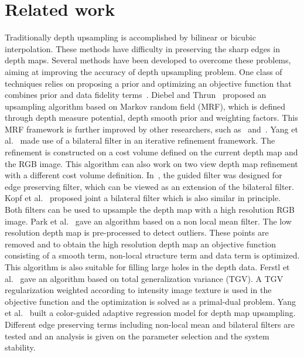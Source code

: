 \section{Related work}
\label{sec:2.relate_work}
Traditionally depth upsampling is accomplished by bilinear or bicubic interpolation. These methods have difficulty in preserving the sharp edges in depth maps. Several methods have been developed to overcome these problems, aiming at improving the accuracy of depth upsampling problem. One class of techniques relies on proposing a prior and optimizing an objective function that combines prior and data fidelity terms~\cite{diebel2005application,yang2007spatial,he2010guided,kopf2007joint,park2011high,ferstl2013image,yang2014color}. 
Diebel and Thrun~\cite{diebel2005application} proposed an upsampling algorithm based on Markov random field (MRF), which is defined through depth measure potential, depth smooth prior and weighting factors. This MRF framework is further improved by other researchers, such as~\cite{lu2011revisit} and~\cite{harrison2010image}. Yang et al.~\cite{yang2007spatial} made use of a bilateral filter in an iterative refinement framework. The refinement is constructed on a cost volume defined on the current depth map and the RGB image. This algorithm can also work on two view depth map refinement with a different cost volume definition. In~\cite{he2010guided}, the guided filter was designed for edge preserving filter, which can be viewed as an extension of the bilateral filter. Kopf et al.~\cite{kopf2007joint} proposed joint a bilateral filter which is also similar in principle. Both filters can be used to upsample the depth map with a high resolution RGB image. Park et al.~\cite{park2011high} gave an algorithm based on a non local mean filter. The low resolution depth map is pre-processed to detect outliers. These points are removed and to obtain the high resolution depth map an objective function consisting of a smooth term, non-local structure term and data term is optimized. This algorithm is also suitable for filling large holes in the depth data. Ferstl et al.~\cite{ferstl2013image} gave an algorithm based on total generalization variance (TGV). A TGV regularization weighted according to intensity image texture is used in the objective function and the optimization is solved as a primal-dual problem. Yang et al.~\cite{yang2014color} built a color-guided adaptive regression model for depth map upsampling. Different edge preserving terms including non-local mean and bilateral filters are tested and an analysis is given on the parameter selection and the system stability.  

